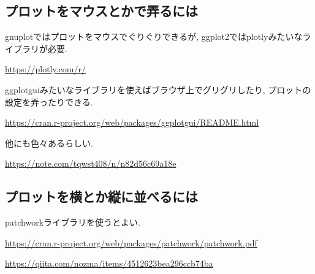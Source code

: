 \documentclass[lualatex,a4paper,12pt,report,ja=standard]{bxjsarticle}
\begin{document}
\subsection{プロットをマウスとかで弄るには}
\label{sec:org6077224}
gnuplotではプロットをマウスでぐりぐりできるが, ggplot2ではplotlyみたいなライブラリが必要.

\url{https://plotly.com/r/}

ggplotguiみたいなライブラリを使えばブラウザ上でグリグリしたり, プロットの設定を弄ったりできる.

\url{https://cran.r-project.org/web/packages/ggplotgui/README.html}

他にも色々あるらしい.

\url{https://note.com/tqwst408/n/n82d56c69a18e}
\subsection{プロットを横とか縦に並べるには}
\label{sec:orgc9eb46d}
patchworkライブラリを使うとよい.

\url{https://cran.r-project.org/web/packages/patchwork/patchwork.pdf}

\url{https://qiita.com/nozma/items/4512623bea296ccb74ba}
\end{document}
